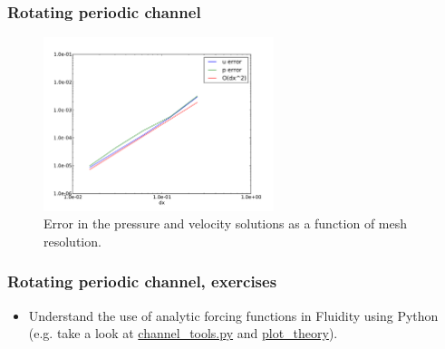 \begin{frame}
    \frametitle{Rotating periodic channel}
\begin{figure}
\includegraphics[width=0.6\textwidth]{./rotating_channel/convergence}
\caption{Error in the pressure and velocity solutions as a function of mesh resolution.}
\end{figure}
\end{frame}
%
\begin{frame}
    \frametitle{Rotating periodic channel, exercises}
\begin{itemize}
\item Understand the use of analytic forcing functions in Fluidity using Python (e.g. take a look at \url{channel_tools.py} and \url{plot_theory}).
\end{itemize}
\end{frame}

